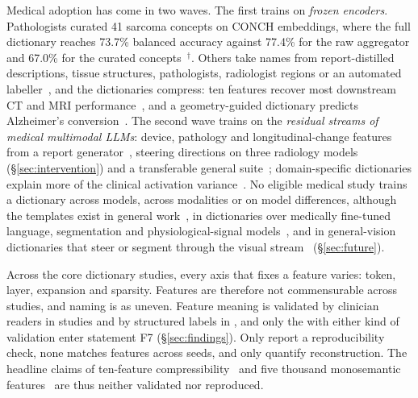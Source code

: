 Medical adoption has come in two waves. The first trains on \emph{frozen encoders}. Pathologists curated
41 sarcoma concepts on CONCH embeddings, where the full dictionary reaches 73.7\% balanced accuracy
against 77.4\% for the raw aggregator and 67.0\% for the curated
concepts~\cite{bisson2026unsupervised}$^{\dagger}$. Others take names from report-distilled
descriptions, tissue structures, pathologists, radiologist regions or an automated
labeller~\cite{abdulaal2024an,le2024learning,kim2026dissecting,zhao2026compositional,redlich2026explainable,nakka2025mammosae,renzulli2025medsae,tang2025cxrlanic,sun2025prototypebased,dasdelen2025cytosae,yan2026a,huang2026classguided,chhetri2026when},
and the dictionaries compress: ten features recover most downstream CT and MRI
performance~\cite{wesp2026sparse}, and a geometry-guided dictionary predicts Alzheimer's
conversion~\cite{nerrise2026geosae}.
The second wave trains on the \emph{residual streams of medical multimodal LLMs}: device, pathology and
longitudinal-change features from a report generator~\cite{bouzid2025insights}, steering directions on
three radiology models~\cite{nooralahzadeh2026universal} (\S\ref{sec:intervention}) and a transferable
general suite~\cite{sadanandan2026mechanistically}; domain-specific dictionaries explain more of the
clinical activation variance~\cite{oneill2025resurrecting}. No eligible medical study trains a dictionary
across models, across modalities or on model differences, although the templates exist in general
work~\cite{thasarathan2025universal,nasirisarvi2025sparc,minder2025overcoming,plantinga2025from}, in
dictionaries over medically fine-tuned language, segmentation and physiological-signal
models~\cite{tan2026efficient,ahmed2026medseglens,lehnschiler2026mechanistic,duan2026cadence}, and in
general-vision dictionaries that steer or segment through the visual
stream~\cite{joseph2025steering,pach2025sparse,stevens2025interpretable} (\S\ref{sec:future}).

Across the \Nsae{} core dictionary studies, every axis that fixes a feature varies: token, layer,
expansion and sparsity. Features are therefore not commensurable across studies, and naming is as
uneven. Feature meaning is validated by clinician readers in \Nsaeclin{} studies and by structured labels
in \Nsaelabel{}, and only the \Nsaeval{} with either kind of validation enter statement F7
(\S\ref{sec:findings}). Only \Nsaestab{} report a reproducibility check, none matches features across
seeds, and only \Nsaerecon{} quantify reconstruction. The headline claims of ten-feature
compressibility~\cite{wesp2026sparse} and five thousand monosemantic features~\cite{tang2025cxrlanic}
are thus neither validated nor reproduced.

